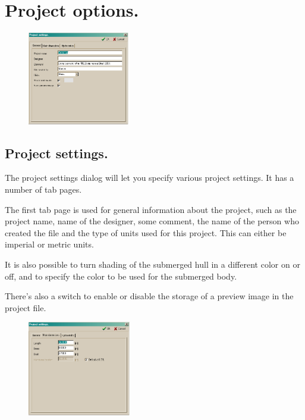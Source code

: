 \documentclass[12pt]{article}
\begin{document}
\section{Project options.}

\begin{figure}
        \centering
        \includegraphics[width=0.4\textwidth,natwidth=401,natheight=363]{projectsettingsdialog-1.png}
        \caption{}
        \label{fig:projsettings1}
\end{figure}

\subsection{Project settings.} \label{project-settings}
The project settings dialog will let you specify various project
settings. It has a number of tab pages.

The first tab page is used for general information about the
project, such as the project name, name of the designer, some
comment, the name of the person who created the file and the
type of units used for this project. This can either be imperial or
metric units.

It is also possible to turn shading of the submerged hull in a
different color on or off, and to specify the color to be used for the
submerged body.

There's also a switch to enable or disable the storage of a
preview image in the project file.

\begin{figure}
        \centering
        \includegraphics[width=0.4\textwidth,natwidth=395,natheight=364]{projectsettingsdialog-2.png}
        \caption{}
        \label{fig:projsettings2}
\end{figure}
\end{document}
